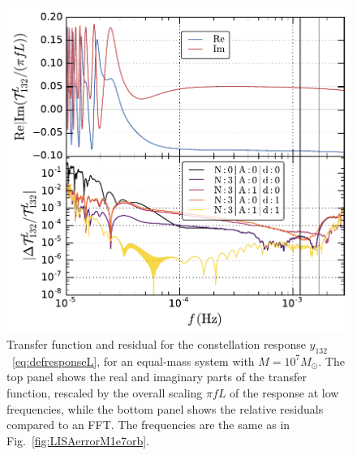 \documentclass[aps,showpacs,twocolumn,
prd,superscriptaddress,nofootinbib]{revtex4-1}
\newcommand{\Msol}{M_{\odot}}
\begin{document}
\begin{figure}
  \centering
  \includegraphics[width=.98\linewidth]{plots/LISAtransfererrorM1e7y12L_py.pdf}
  \caption{Transfer function and residual for the constellation response $y_{132}$~\eqref{eq:defresponseL}, for an equal-mass system with $M=10^{7} \Msol$. The top panel shows the real and imaginary parts of the transfer function, rescaled by the overall scaling $\pi f L$ of the response at low frequencies, while the bottom panel shows the relative residuals compared to an FFT. The frequencies are the same as in Fig.~\ref{fig:LISAerrorM1e7orb}.}
  \label{fig:LISAerrorM1e7const}
\end{figure}
\end{document}
